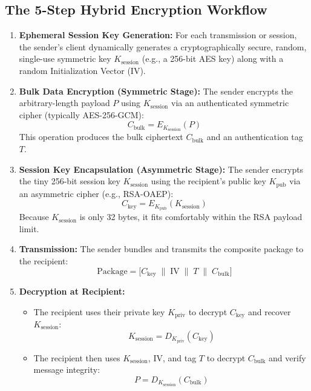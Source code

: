 \subsection{The 5-Step Hybrid Encryption Workflow}

\begin{enumerate}
\item \textbf{Ephemeral Session Key Generation:}
For each transmission or session, the sender's client dynamically generates a cryptographically secure, random, single-use symmetric key $K_{\text{session}}$ (e.g., a 256-bit AES key) along with a random Initialization Vector ($\text{IV}$).
\item \textbf{Bulk Data Encryption (Symmetric Stage):}
The sender encrypts the arbitrary-length payload $P$ using $K_{\text{session}}$ via an authenticated symmetric cipher (typically AES-256-GCM):
\[ C_{\text{bulk}} = E_{K_{\text{session}}}(P) \]
This operation produces the bulk ciphertext $C_{\text{bulk}}$ and an authentication tag $T$.
\item \textbf{Session Key Encapsulation (Asymmetric Stage):}
The sender encrypts the tiny 256-bit session key $K_{\text{session}}$ using the recipient's public key $K_{\text{pub}}$ via an asymmetric cipher (e.g., RSA-OAEP):
\[ C_{\text{key}} = E_{K_{\text{pub}}}(K_{\text{session}}) \]
Because $K_{\text{session}}$ is only 32 bytes, it fits comfortably within the RSA payload limit.
\item \textbf{Transmission:}
The sender bundles and transmits the composite package to the recipient:
\[ \text{Package} = \Big[ C_{\text{key}} \;\|\; \text{IV} \;\|\; T \;\|\; C_{\text{bulk}} \Big] \]
\item \textbf{Decryption at Recipient:}
\begin{itemize}
\item The recipient uses their private key $K_{\text{priv}}$ to decrypt $C_{\text{key}}$ and recover $K_{\text{session}}$:
\[ K_{\text{session}} = D_{K_{\text{priv}}}(C_{\text{key}}) \]
\item The recipient then uses $K_{\text{session}}$, $\text{IV}$, and tag $T$ to decrypt $C_{\text{bulk}}$ and verify message integrity:
\[ P = D_{K_{\text{session}}}(C_{\text{bulk}}) \]
\end{itemize}
\end{enumerate}

